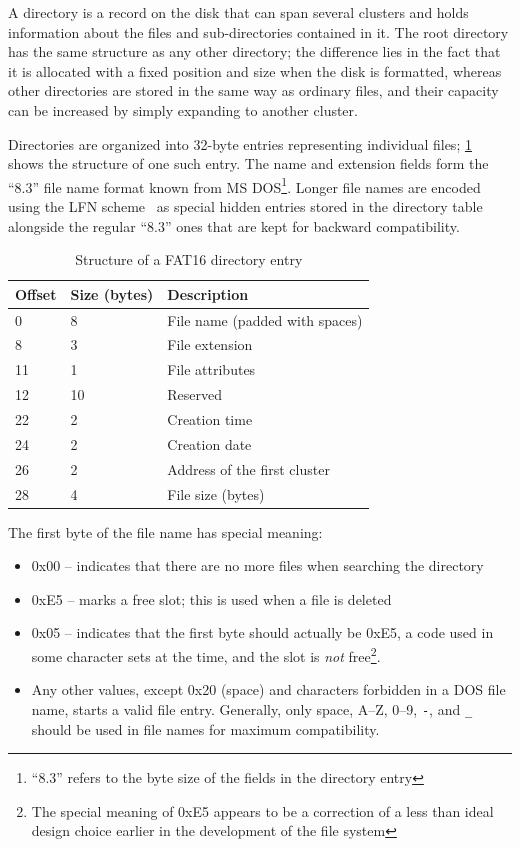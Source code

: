 A directory is a record on the disk that can span several clusters and holds information about the files and sub-directories contained in it. The root directory has the same structure as any other directory; the difference lies in the fact that it is allocated with a fixed position and size when the disk is formatted, whereas other directories are stored in the same way as ordinary files, and their capacity can be increased by simply expanding to another cluster.

Directories are organized into 32-byte entries representing individual files; \cref{tab:fat16_dir_entry} shows the structure of one such entry. The name and extension fields form the ``8.3'' file name format known from MS DOS\footnote{``8.3'' refers to the byte size of the fields in the directory entry}. Longer file names are encoded using the \gls{LFN} scheme~\cite{fat-lfn} as special hidden entries stored in the directory table alongside the regular ``8.3'' ones that are kept for backward compatibility.

\begin{table}
	\centering
	\begin{tabular}{lll}
		\toprule
		\textbf{Offset} & \textbf{Size (bytes)}  & \textbf{Description}\\
		\midrule
		0 & 8 & File name (padded with spaces) \\
		8 & 3 & File extension \\
		11 & 1 & File attributes \\
		12 & 10 & Reserved \\
		22 & 2 & Creation time \\
		24 & 2 & Creation date \\
		26 & 2 & Address of the first cluster \\
		28 & 4 & File size (bytes) \\
		\bottomrule
	\end{tabular}
	\caption{\label{tab:fat16_dir_entry}Structure of a FAT16 directory entry}
\end{table}

\noindent
The first byte of the file name has special meaning:

\begin{itemize}
	\item 0x00 -- indicates that there are no more files when searching the directory
	\item 0xE5 -- marks a free slot; this is used when a file is deleted
	\item 0x05 -- indicates that the first byte should actually be 0xE5, a code used in some character sets at the time, and the slot is \textit{not} free\footnote{The special meaning of 0xE5 appears to be a correction of a less than ideal design choice earlier in the development of the file system}.
	\item Any other values, except 0x20 (space) and characters forbidden in a DOS file name, starts a valid file entry. Generally, only space, A--Z, 0--9, \verb|-|, and \verb|_| should be used in file names for maximum compatibility.
\end{itemize}

